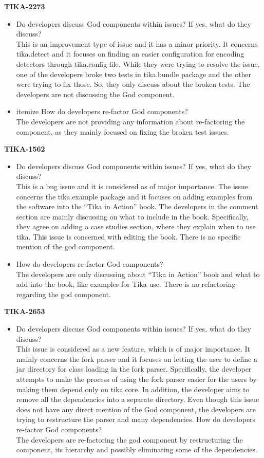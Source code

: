 \documentclass{article}
\begin{document}
\textbf{TIKA-2273}
\begin{itemize}
    \item Do developers discuss God components within issues? If yes, what do they discuss?\\
    This is an improvement type of issue and it has a minor priority. It concerns tika.detect and it focuses on finding an easier configuration for encoding detectors through tika.config file. While they were trying to resolve the issue, one of the developers broke two tests in tika.bundle package and the other were trying to fix those. So, they only discuss about the broken tests. The developers are not discussing the God component.
    \item{itemize}	How do developers re-factor God components?\\
    The developers are not providing any information about re-factoring the component, as they mainly focused on fixing the broken test issues.
\end{itemize}

\textbf{TIKA-1562}
\begin{itemize}
    \item Do developers discuss God components within issues? If yes, what do they discuss?\\
    This is a bug issue and it is considered as of major importance. The issue concerns the tika.example package and it focuses on adding examples from the software into the “Tika in Action” book. The developers in the comment section are mainly discussing on what to include in the book. Specifically, they agree on adding a case studies section, where they explain when to use tika. This issue is concerned with editing the book. There is no specific mention of the god component. 
    \item How do developers re-factor God components?\\
    The developers are only discussing about “Tika in Action” book and what to add into the book, like examples for Tika use. There is no refactoring regarding the god component.
\end{itemize}

\textbf{TIKA-2653}
\begin{itemize}
    \item Do developers discuss God components within issues? If yes, what do they discuss?\\
    This issue is considered as a new feature, which is of major importance. It mainly concerns the fork parser and it focuses on letting the user to define a jar directory for class loading in the fork parser. Specifically, the developer attempts to make the process of using the fork parser easier for the users by making them depend only on tika.core. In addition, the developer aims to remove all the dependencies into a separate directory.  Even though this issue does not have any direct mention of the God component, the developers are trying to restructure the parser and many dependencies.
    How do developers re-factor God components?\\
    The developers are re-factoring the god component by restructuring the component, its hierarchy and possibly eliminating some of the dependencies.  
\end{itemize}
\end{document}
